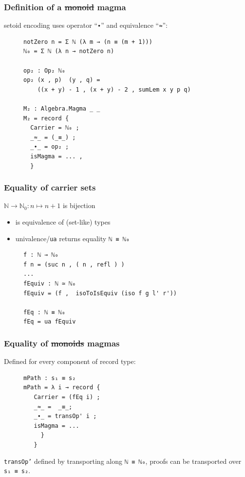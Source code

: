 \documentclass[english]{beamer}
\begin{document}
\begin{frame}[fragile]
\frametitle{Definition of a \st{monoid} magma}

setoid encoding uses operator ``\texttt{∙}'' and equivalence ``\texttt{≈}'':

\begin{figure}
\begin{BVerbatim}
notZero n = Σ ℕ (λ m → (n ≡ (m + 1)))
ℕ₀ = Σ ℕ (λ n → notZero n) 

op₂ : Op₂ ℕ₀
op₂ (x , p)  (y , q) = 
    ((x + y) - 1 , (x + y) - 2 , sumLem x y p q)

M₂ : Algebra.Magma _ _
M₂ = record { 
  Carrier = ℕ₀ ;
  _≈_ = (_≡_) ;
  _∙_ = op₂ ;
  isMagma = ... ,
  }
\end{BVerbatim}
\end{figure}
 
\end{frame}

\begin{frame}[fragile]
\frametitle{Equality of carrier sets}

 $\mathbb{N} \rightarrow \mathbb{N}_0: n\mapsto n + 1 $ is bijection
 
 \begin{itemize}
  \item is equivalence of (set-like) types
  \item univalence/\texttt{ua} returns equality \texttt{ℕ ≡ ℕ₀}
 \end{itemize}
 
 
 \begin{figure}
 \begin{BVerbatim}
f : ℕ → ℕ₀ 
f n = (suc n , ( n , refl ) )
...
fEquiv : ℕ ≃ ℕ₀ 
fEquiv = (f ,  isoToIsEquiv (iso f g l' r'))

fEq : ℕ ≡ ℕ₀ 
fEq = ua fEquiv
 \end{BVerbatim}
\end{figure}

\end{frame}





\begin{frame}[fragile]
\frametitle{Equality of \st{monoids} magmas}

Defined for every component of record type:

\begin{figure}
\begin{BVerbatim}
mPath : s₁ ≡ s₂
mPath = λ i → record {
   Carrier = (fEq i) ;
   _≈_ =  _≡_;
   _∙_ = transOp' i ;
   isMagma = ...
     }
   }
\end{BVerbatim}
\end{figure}

\texttt{transOp'} defined by transporting along \texttt{ℕ ≡ ℕ₀}, proofs can be transported over \texttt{s₁ ≡ s₂}.

\end{frame}
\end{document}
